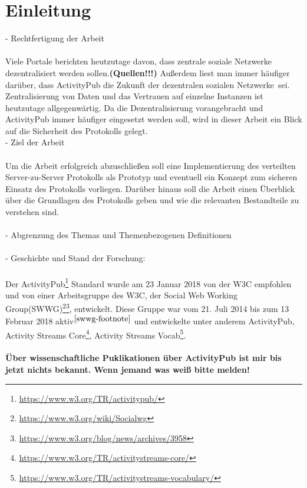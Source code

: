 
\chapter{Einleitung}
\label{ch:Introduction}
- 	Rechtfertigung der Arbeit\\\\
	Viele Portale berichten heutzutage davon, dass zentrale soziale Netzwerke dezentralisiert werden sollen.\textbf{(Quellen!!!)} Außerdem liest man immer häufiger darüber, dass ActivityPub die \glqq Zukunft der dezentralen sozialen Netzwerke\grqq~sei. Zentralisierung von Daten und das Vertrauen auf einzelne Instanzen ist heutzutage allgegenwärtig. Da die Dezentralisierung vorangebracht und ActivityPub immer häufiger eingesetzt werden soll, wird in dieser Arbeit ein Blick auf die Sicherheit des Protokolls gelegt.\\

- 	Ziel der Arbeit\\\\
	Um die Arbeit erfolgreich abzuschließen soll eine Implementierung des verteilten Server-zu-Server
	Protokolls als Prototyp und eventuell ein Konzept zum sicheren Einsatz des Protokolls vorliegen. Darüber hinaus soll die Arbeit einen Überblick über die Grundlagen des Protokolls geben und wie die relevanten Bestandteile zu verstehen sind. \\\\
- 	Abgrenzung des Themas und Themenbezogenen Definitionen\\\\
	
- 	Geschichte und Stand der Forschung:\\\\
	Der ActivityPub\footnote{\url{https://www.w3.org/TR/activitypub/}} Standard wurde am 23 Januar 2018 von der W3C empfohlen und von einer Arbeitsgruppe des W3C, der Social Web Working Group(SWWG)\footnote{\url{https://www.w3.org/wiki/Socialwg}\label{swwg-footnote}}\footnote{\url{https://www.w3.org/blog/news/archives/3958}}, entwickelt. Diese Gruppe war vom 21. Juli 2014 bis zum 13 Februar 2018 aktiv$^{\ref{swwg-footnote}}$ und entwickelte unter anderem ActivityPub, Activity Streams Core\footnote{\url{https://www.w3.org/TR/activitystreams-core/}}, Activity Streams Vocab\footnote{\url{https://www.w3.org/TR/activitystreams-vocabulary/}}.
	\\\\\textbf{Über wissenschaftliche Puklikationen über ActivityPub ist mir bis jetzt nichts bekannt. Wenn jemand was weiß bitte melden!}
